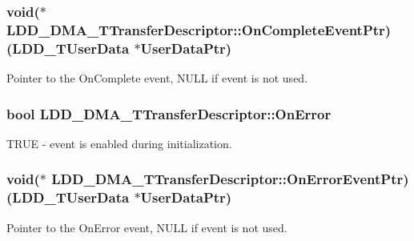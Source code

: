 \subsubsection[{On\+Complete\+Event\+Ptr}]{\setlength{\rightskip}{0pt plus 5cm}void($\ast$ L\+D\+D\+\_\+\+D\+M\+A\+\_\+\+T\+Transfer\+Descriptor\+::\+On\+Complete\+Event\+Ptr) ({\bf L\+D\+D\+\_\+\+T\+User\+Data} $\ast${\bf User\+Data\+Ptr})}\label{struct_l_d_d___d_m_a___t_transfer_descriptor_a7a3c1cd12b7f66760b5d02989409ac48}
Pointer to the On\+Complete event, N\+U\+L\+L if event is not used. \hypertarget{struct_l_d_d___d_m_a___t_transfer_descriptor_a3ddeb9c7243015b0ee7afd15235ce37b}{}
\subsubsection[{On\+Error}]{\setlength{\rightskip}{0pt plus 5cm}bool L\+D\+D\+\_\+\+D\+M\+A\+\_\+\+T\+Transfer\+Descriptor\+::\+On\+Error}\label{struct_l_d_d___d_m_a___t_transfer_descriptor_a3ddeb9c7243015b0ee7afd15235ce37b}
T\+R\+U\+E -\/ event is enabled during initialization. \hypertarget{struct_l_d_d___d_m_a___t_transfer_descriptor_a9d97c36a86505594fd2642c1242f7460}{}
\subsubsection[{On\+Error\+Event\+Ptr}]{\setlength{\rightskip}{0pt plus 5cm}void($\ast$ L\+D\+D\+\_\+\+D\+M\+A\+\_\+\+T\+Transfer\+Descriptor\+::\+On\+Error\+Event\+Ptr) ({\bf L\+D\+D\+\_\+\+T\+User\+Data} $\ast${\bf User\+Data\+Ptr})}\label{struct_l_d_d___d_m_a___t_transfer_descriptor_a9d97c36a86505594fd2642c1242f7460}
Pointer to the On\+Error event, N\+U\+L\+L if event is not used. \hypertarget{struct_l_d_d___d_m_a___t_transfer_descriptor_a27b37f43ef69a8644ec04166660a7c24}{}
